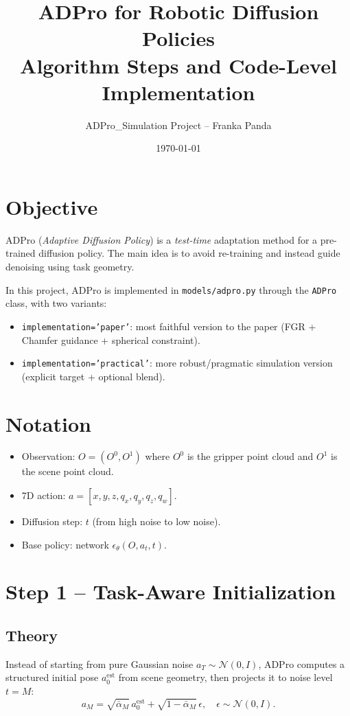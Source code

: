 \documentclass[11pt,a4paper]{article}
\title{ADPro for Robotic Diffusion Policies\\\large Algorithm Steps and Code-Level Implementation}
\author{ADPro_Simulation Project -- Franka Panda}
\date{\today}
\begin{document}
\maketitle

\section{Objective}
ADPro (\emph{Adaptive Diffusion Policy}) is a \emph{test-time} adaptation method for a pre-trained diffusion policy.
The main idea is to avoid re-training and instead guide denoising using task geometry.

In this project, ADPro is implemented in \texttt{models/adpro.py} through the \texttt{ADPro} class, with two variants:
\begin{itemize}
\item \texttt{implementation='paper'}: most faithful version to the paper (FGR + Chamfer guidance + spherical constraint).
\item \texttt{implementation='practical'}: more robust/pragmatic simulation version (explicit target + optional blend).
\end{itemize}

\section{Notation}
\begin{itemize}
\item Observation: $O = (O^0, O^1)$ where $O^0$ is the gripper point cloud and $O^1$ is the scene point cloud.
\item 7D action: $a=[x,y,z,q_x,q_y,q_z,q_w]$.
\item Diffusion step: $t$ (from high noise to low noise).
\item Base policy: network $\epsilon_\theta(O,a_t,t)$.
\end{itemize}

\section{Step 1 -- Task-Aware Initialization}
\subsection{Theory}
Instead of starting from pure Gaussian noise $a_T\sim\mathcal N(0,I)$, ADPro computes a structured initial pose $a_0^{\text{est}}$ from scene geometry,
then projects it to noise level $t=M$:
\begin{equation}
 a_M = \sqrt{\bar\alpha_M}\,a_0^{\text{est}} + \sqrt{1-\bar\alpha_M}\,\epsilon,\quad \epsilon\sim\mathcal N(0,I).
\end{equation}
\end{document}
